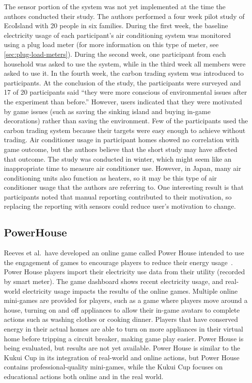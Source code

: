 The sensor portion of the system was not yet implemented at the time the authors conducted their study. The authors performed a four week pilot study of EcoIsland with 20 people in six families. During the first week, the baseline electricity usage of each participant's air conditioning system was monitored using a plug load meter (for more information on this type of meter, see \autoref{sec:plug-load-meters}). During the second week, one participant from each household was asked to use the system, while in the third week all members were asked to use it. In the fourth week, the carbon trading system was introduced to participants. At the conclusion of the study, the participants were surveyed and 17 of 20 participants said ``they were more conscious of environmental issues after the experiment than before.'' However, users indicated that they were motivated by game issues (such as saving the sinking island and buying in-game decorations) rather than saving the environment. Few of the participants used the carbon trading system because their targets were easy enough to achieve without trading. Air conditioner usage in participant homes showed no correlation with game outcome, but the authors believe that the short study may have affected that outcome. The study was conducted in winter, which might seem like an inappropriate time to measure air conditioner use. However, in Japan, many air conditioning units also function as heaters, so it may be this type of air conditioner usage that the authors are referring to. One interesting result is that participants noted that manual reporting contributed to their motivation, so replacing the reporting with sensors could reduce user's motivation to change.


\subsection{PowerHouse}

Reeves et al.\ have developed an online game called Power House intended to use the engagement of games to encourage players to reduce their energy usage~\cite{Reeves2011powerhouse}. Power House players import their electricity use data from their utility (recorded by smart meter). The game dashboard shows recent electricity usage, and real-world electricity usage impacts the results of the online games. Multiple online mini-games are provided for players, such as a game where players move around a house, turning on and off appliances to allow their in-game avatars to complete actions such as washing clothes or cooking dinner. Players that have conserved energy in their actual homes are able to turn on more appliances in their virtual home before tripping a circuit breaker, making game play easier. Power House is being evaluated, but results are not yet available. Power House is similar to the Kukui Cup in its integration of real-world and online actions, but Power House contains professional-quality mini-games, while the Kukui Cup focuses on educational actions both online and in the real world.


